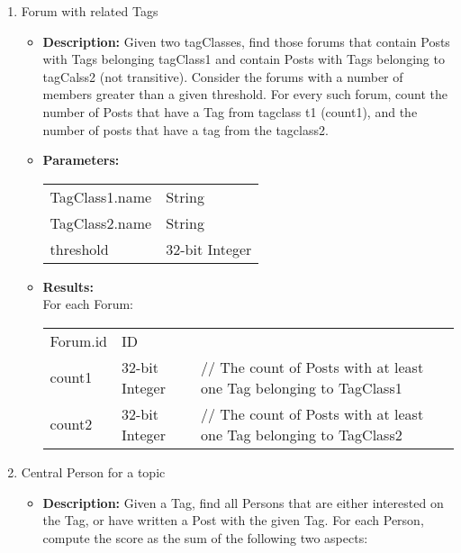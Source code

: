 {\begin{enumerate}
      \item Forum with related Tags
            \begin{itemize}
                \item \textbf{Description:}
                  Given two tagClasses, find those forums that contain Posts with Tags belonging tagClass1 and contain
                  Posts with Tags belonging to tagCalss2 (not transitive). Consider the forums with a number of members
                  greater than a given threshold.
                  For every such forum, count the number of Posts  that have a Tag from tagclass t1 (count1), and the
                  number of posts that have a tag  from the tagclass2.
                \item \textbf{Parameters:} \\
                    \begin{tabular}{ll}
                      TagClass1.name & String \\
                      TagClass2.name & String \\
                      threshold & 32-bit Integer \\
                    \end{tabular}
                \item \textbf{Results:} \\
                  For each Forum:
                    \begin{tabular}{lll}
                      Forum.id & ID & \\
                      count1 & 32-bit Integer & \parbox[t]{20cm}{ // The count of Posts with at least one Tag belonging
                        to TagClass1 \strut} \\
                      count2 & 32-bit Integer & \parbox[t]{20cm}{ // The count of Posts with at least one Tag belonging
                        to TagClass2 \strut} \\
                    \end{tabular}
                    \end{itemize}

      \item Central Person for a topic
            \begin{itemize}
                \item \textbf{Description:}
                  Given a Tag, find all Persons that are either interested on the Tag, or have written a Post with the
                  given Tag. For each Person, compute the score as the sum of the following two aspects:


\end{itemize}
\end{enumerate}}
